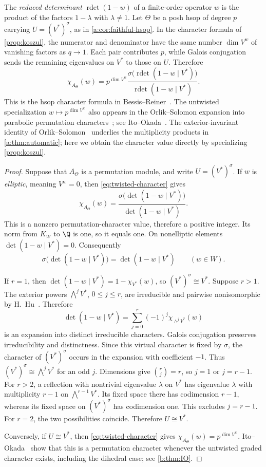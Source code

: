 \documentclass[11pt]{amsart}
\DeclareMathOperator{\rdet}{rdet}
\newcommand{\defn}[1]{\emph{\color{darkblue}#1}}
\theoremstyle{definition}
\begin{document}
The \defn{reduced determinant}
$\rdet(1-w)$ of a finite-order operator $w$ is the product of the factors
$1-\lambda$ with $\lambda\ne1$. Let $\Theta$ be a posh hsop of degree $p$
carrying $U=(V^*)^\sigma$, as in \cref{a:cor:faithful-hsop}.
In the character formula of \cref{prop:koszul}, the numerator and
denominator have the same number $\dim V^w$ of vanishing factors as
$q\to1$. Each pair contributes $p$, while Galois conjugation sends
the remaining eigenvalues on $V^*$ to those on $U$. Therefore
\begin{equation}\label{eq:twisted-character}
 \chi_{A_\Theta}(w)=p^{\dim V^w}
 \frac{\sigma\bigl(\rdet(1-w\mid V^*)\bigr)}
      {\rdet(1-w\mid V^*)}.
\end{equation}
This is the hsop character formula in
Bessis--Reiner~\cite[Proposition~4.2, equation~(4.2)]{BR}.
The untwisted specialization $w\mapsto p^{\dim V^w}$ also appears in
the Orlik--Solomon expansion into parabolic permutation characters~\cite{OS82,OS83};
see Ito--Okada~\cite[Proposition~2.3]{IO}.
The exterior-invariant identity of Orlik--Solomon~\cite[Theorem~3.1]{OS}
underlies the multiplicity products in \cref{a:thm:automatic}; here
we obtain the character value directly by specializing
\cref{prop:koszul}.

\permutationtheorem*
\begin{proof}
Suppose that $A_\Theta$ is a permutation module, and write
$U=(V^*)^\sigma$. If $w$ is \defn{elliptic}, meaning $V^w=0$, then
\cref{eq:twisted-character} gives
\[
 \chi_{A_\Theta}(w)=
 \frac{\sigma\bigl(\det(1-w\mid V^*)\bigr)}
      {\det(1-w\mid V^*)}.
\]
This is a nonzero permutation-character value, therefore a positive
integer. Its norm from $K_W$ to $\Q$ is one, so it equals one.
On nonelliptic elements $\det(1-w\mid V^*)=0$. Consequently
\[
 \sigma\bigl(\det(1-w\mid V^*)\bigr)=\det(1-w\mid V^*)
 \qquad(w\in W).
\]

If $r=1$, then $\det(1-w\mid V^*)=1-\chi_{V^*}(w)$, so
$(V^*)^\sigma\cong V^*$. Suppose $r>1$.
The exterior powers $\bigwedge^jV^*$, $0\leq j\leq r$, are irreducible
and pairwise nonisomorphic by H.~Hu~\cite[Theorem~1.2]{Hu}. Therefore
\[
 \det(1-w\mid V^*)
 =\sum_{j=0}^r(-1)^j\chi_{\wedge^jV^*}(w)
\]
is an expansion into distinct irreducible characters. Galois
conjugation preserves irreducibility and distinctness. Since this
virtual character is fixed by $\sigma$, the character of
$(V^*)^\sigma$ occurs in the expansion with coefficient $-1$.
Thus $(V^*)^\sigma\cong\bigwedge^jV^*$ for an odd $j$.
Dimensions give $\binom rj=r$, so $j=1$ or $j=r-1$.
For $r>2$, a reflection with nontrivial eigenvalue $\lambda$ on $V^*$
has eigenvalue $\lambda$ with multiplicity $r-1$ on
$\bigwedge^{r-1}V^*$. Its fixed space there has codimension $r-1$,
whereas its fixed space on $(V^*)^\sigma$ has codimension one.
This excludes $j=r-1$.
For $r=2$, the two possibilities coincide. Therefore $U\cong V^*$.

Conversely, if $U\cong V^*$, then \cref{eq:twisted-character} gives
$\chi_{A_\Theta}(w)=p^{\dim V^w}$. Ito--Okada~\cite[Theorem 1.4]{IO} show
that this is a permutation character whenever the untwisted graded
character exists, including the dihedral case; see \cref{b:thm:IO}.
\end{proof}
\end{document}
